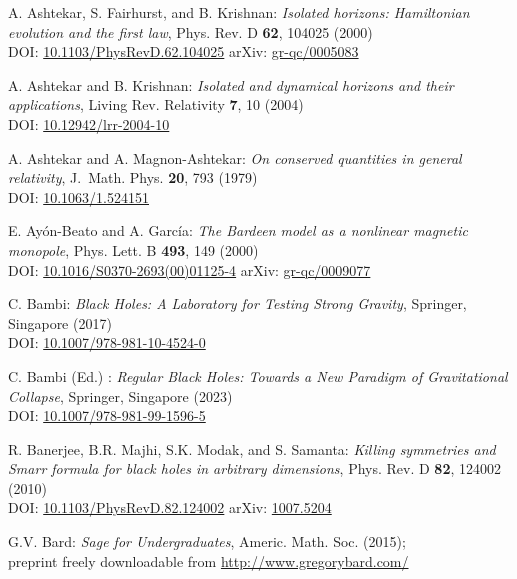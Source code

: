 \begin{thebibliography}{123}
A. Ashtekar, S. Fairhurst, and B. Krishnan:
{\em Isolated horizons: Hamiltonian evolution and the first law},
Phys. Rev. D {\bf 62}, 104025 (2000)\\
DOI: \href{https://doi.org/10.1103/PhysRevD.62.104025}{10.1103/PhysRevD.62.104025}\hfill
arXiv: \href{https://arxiv.org/abs/gr-qc/0005083}{gr-qc/0005083}

A. Ashtekar and B. Krishnan: {\em Isolated and dynamical horizons
and their applications},
Living Rev. Relativity {\bf 7}, 10 (2004)\\
DOI: \href{https://doi.org/10.12942/lrr-2004-10}{10.12942/lrr-2004-10}

A. Ashtekar and A. Magnon-Ashtekar:
{\em On conserved quantities in general relativity},
J.~Math. Phys. {\bf 20}, 793 (1979)\\
DOI: \href{https://doi.org/10.1063/1.524151}{10.1063/1.524151}

E. Ayón-Beato and A. García:
{\em The Bardeen model as a nonlinear magnetic monopole},
Phys. Lett. B {\bf 493}, 149 (2000)\\
DOI: \href{https://doi.org/10.1016/S0370-2693(00)01125-4}{10.1016/S0370-2693(00)01125-4}\hfill
arXiv: \href{https://arxiv.org/abs/gr-qc/0009077}{gr-qc/0009077}

C. Bambi: {\em Black Holes: A Laboratory for Testing Strong Gravity},
Springer, Singapore (2017)\\
DOI: \href{https://doi.org/10.1007/978-981-10-4524-0}{10.1007/978-981-10-4524-0}

C. Bambi (Ed.) : {\em Regular Black Holes: Towards a New Paradigm of Gravitational Collapse},
Springer, Singapore (2023)\\
DOI: \href{https://doi.org/10.1007/978-981-99-1596-5}{10.1007/978-981-99-1596-5}

R. Banerjee, B.R. Majhi, S.K. Modak, and S. Samanta:
{\em Killing symmetries and Smarr formula for black holes in arbitrary dimensions},
Phys. Rev. D {\bf 82}, 124002 (2010)\\
DOI: \href{https://doi.org/10.1103/PhysRevD.82.124002}{10.1103/PhysRevD.82.124002}\hfill
arXiv: \href{https://arxiv.org/abs/1007.5204}{1007.5204}

G.V. Bard: {\em Sage for Undergraduates}, Americ. Math. Soc. (2015); \\
preprint freely downloadable from \url{http://www.gregorybard.com/}


\end{thebibliography}
